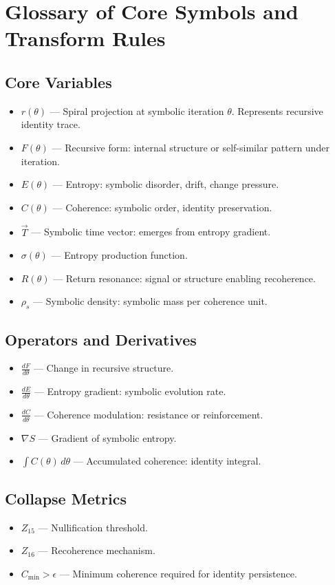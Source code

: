 \documentclass[12pt]{article}
\begin{document}
\section{Glossary of Core Symbols and Transform Rules}

\subsection*{Core Variables}
\begin{itemize}
  \item $r(\theta)$ — Spiral projection at symbolic iteration $\theta$. Represents recursive identity trace.
  \item $F(\theta)$ — Recursive form: internal structure or self-similar pattern under iteration.
  \item $E(\theta)$ — Entropy: symbolic disorder, drift, change pressure.
  \item $C(\theta)$ — Coherence: symbolic order, identity preservation.
  \item $\vec{T}$ — Symbolic time vector: emerges from entropy gradient.
  \item $\sigma(\theta)$ — Entropy production function.
  \item $R(\theta)$ — Return resonance: signal or structure enabling recoherence.
  \item $\rho_s$ — Symbolic density: symbolic mass per coherence unit.
\end{itemize}

\subsection*{Operators and Derivatives}
\begin{itemize}
  \item $\frac{dF}{d\theta}$ — Change in recursive structure.
  \item $\frac{dE}{d\theta}$ — Entropy gradient: symbolic evolution rate.
  \item $\frac{dC}{d\theta}$ — Coherence modulation: resistance or reinforcement.
  \item $\nabla S$ — Gradient of symbolic entropy.
  \item $\int C(\theta) \, d\theta$ — Accumulated coherence: identity integral.
\end{itemize}

\subsection*{Collapse Metrics}
\begin{itemize}
  \item $Z_{15}$ — Nullification threshold.
  \item $Z_{16}$ — Recoherence mechanism.
  \item $C_{\text{min}} > \epsilon$ — Minimum coherence required for identity persistence.
\end{itemize}
\end{document}
